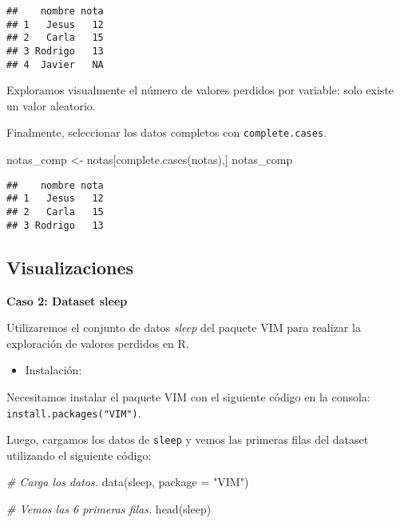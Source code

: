 \documentclass[
]{article}
\newenvironment{Shaded}{\begin{snugshade}}{\end{snugshade}}
\newcommand{\AttributeTok}[1]{\textcolor[rgb]{0.77,0.63,0.00}{#1}}
\newcommand{\CommentTok}[1]{\textcolor[rgb]{0.56,0.35,0.01}{\textit{#1}}}
\newcommand{\FunctionTok}[1]{\textcolor[rgb]{0.00,0.00,0.00}{#1}}
\newcommand{\NormalTok}[1]{#1}
\newcommand{\OtherTok}[1]{\textcolor[rgb]{0.56,0.35,0.01}{#1}}
\newcommand{\StringTok}[1]{\textcolor[rgb]{0.31,0.60,0.02}{#1}}
\providecommand{\tightlist}{%
  \setlength{\itemsep}{0pt}\setlength{\parskip}{0pt}}
\begin{document}
\begin{verbatim}
##    nombre nota
## 1   Jesus   12
## 2   Carla   15
## 3 Rodrigo   13
## 4  Javier   NA
\end{verbatim}

Exploramos visualmente el número de valores perdidos por variable: solo
existe un valor aleatorio.

Finalmente, seleccionar los datos completos con \texttt{complete.cases}.

\begin{Shaded}
\begin{Highlighting}[]
\NormalTok{notas\_comp }\OtherTok{\textless{}{-}}\NormalTok{ notas[}\FunctionTok{complete.cases}\NormalTok{(notas),]}
\NormalTok{notas\_comp}
\end{Highlighting}
\end{Shaded}

\begin{verbatim}
##    nombre nota
## 1   Jesus   12
## 2   Carla   15
## 3 Rodrigo   13
\end{verbatim}

\hypertarget{visualizaciones}{%
\subsection{Visualizaciones}\label{visualizaciones}}

\textbf{Caso 2: Dataset sleep}

Utilizaremos el conjunto de datos \emph{sleep} del paquete VIM para
realizar la exploración de valores perdidos en R.

\begin{itemize}
\tightlist
\item
  Instalación:
\end{itemize}

Necesitamos instalar el paquete VIM con el siguiente código en la
consola: \texttt{install.packages("VIM")}.

Luego, cargamos los datos de \texttt{sleep} y vemos las primeras filas
del dataset utilizando el siguiente código:

\begin{Shaded}
\begin{Highlighting}[]
\CommentTok{\# Carga los datos.}
\FunctionTok{data}\NormalTok{(sleep, }\AttributeTok{package =} \StringTok{"VIM"}\NormalTok{)}

\CommentTok{\# Vemos las 6 primeras filas.}
\FunctionTok{head}\NormalTok{(sleep)}
\end{Highlighting}
\end{Shaded}
\end{document}
